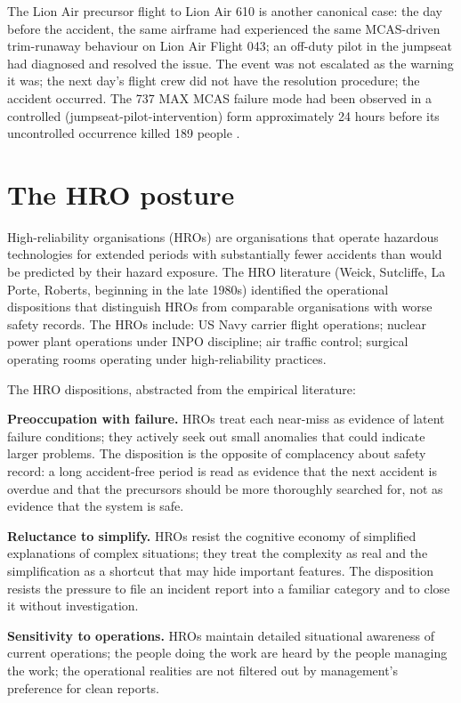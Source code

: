 The Lion Air precursor flight to Lion Air 610 \cite{acc:knkt-lion-air-610-2019} is another canonical case: the day before the accident, the same airframe had experienced the same MCAS-driven trim-runaway behaviour on Lion Air Flight 043; an off-duty pilot in the jumpseat had diagnosed and resolved the issue. The event was not escalated as the warning it was; the next day's flight crew did not have the resolution procedure; the accident occurred. The 737 MAX MCAS failure mode had been observed in a controlled (jumpseat-pilot-intervention) form approximately 24 hours before its uncontrolled occurrence killed 189 people \cite{acc:house-737max-2020}.

\section{The HRO posture}

High-reliability organisations (HROs) are organisations that operate hazardous technologies for extended periods with substantially fewer accidents than would be predicted by their hazard exposure. The HRO literature (Weick, Sutcliffe, La Porte, Roberts, beginning in the late 1980s) identified the operational dispositions that distinguish HROs from comparable organisations with worse safety records. The HROs include: US Navy carrier flight operations; nuclear power plant operations under INPO discipline; air traffic control; surgical operating rooms operating under high-reliability practices.

The HRO dispositions, abstracted from the empirical literature:

\textbf{Preoccupation with failure.} HROs treat each near-miss as evidence of latent failure conditions; they actively seek out small anomalies that could indicate larger problems. The disposition is the opposite of complacency about safety record: a long accident-free period is read as evidence that the next accident is overdue and that the precursors should be more thoroughly searched for, not as evidence that the system is safe.

\textbf{Reluctance to simplify.} HROs resist the cognitive economy of simplified explanations of complex situations; they treat the complexity as real and the simplification as a shortcut that may hide important features. The disposition resists the pressure to file an incident report into a familiar category and to close it without investigation.

\textbf{Sensitivity to operations.} HROs maintain detailed situational awareness of current operations; the people doing the work are heard by the people managing the work; the operational realities are not filtered out by management's preference for clean reports.

